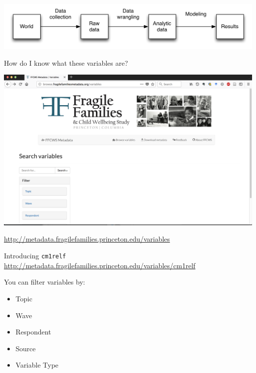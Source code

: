 \documentclass{beamer}
\begin{document}
\begin{frame}

\begin{center}
\includegraphics[width=\textwidth]{figures/scientific_pipeline}
\end{center}

\end{frame}
\begin{frame}

How do I know what these variables are? 

\begin{center}
\includegraphics[width=\textwidth]{figures/ff_metadata_browser}
\end{center}

\vfill

\url{http://metadata.fragilefamilies.princeton.edu/variables}

\end{frame}
\begin{frame}

Introducing \texttt{cm1relf}\\

\url{http://metadata.fragilefamilies.princeton.edu/variables/cm1relf}

\end{frame}
\begin{frame}

You can filter variables by:
\begin{itemize}
\item Topic
\item Wave
\item Respondent
\item Source
\item Variable Type
\end{itemize}

\end{frame}	
\end{document}
